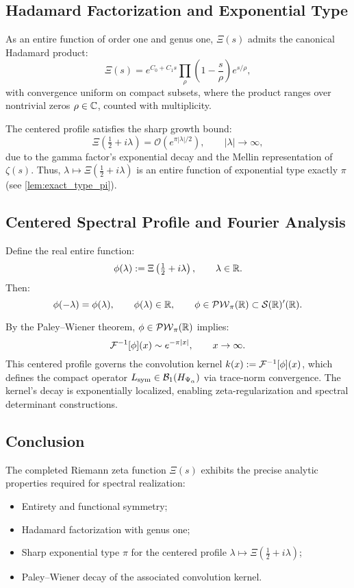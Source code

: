 \subsection*{Hadamard Factorization and Exponential Type}

As an entire function of order one and genus one, \( \Xi(s) \) admits the canonical Hadamard product:
\[
\Xi(s) = e^{C_0 + C_1 s} \prod_{\rho} \left( 1 - \frac{s}{\rho} \right) e^{s/\rho},
\]
with convergence uniform on compact subsets, where the product ranges over nontrivial zeros \( \rho \in \mathbb{C} \), counted with multiplicity.

The centered profile satisfies the sharp growth bound:
\[
\Xi\left( \tfrac{1}{2} + i\lambda \right) = \mathcal{O}\left( e^{\pi |\lambda| / 2} \right), \qquad |\lambda| \to \infty,
\]
due to the gamma factor’s exponential decay and the Mellin representation of \( \zeta(s) \). Thus, \( \lambda \mapsto \Xi(\tfrac{1}{2} + i\lambda) \) is an entire function of exponential type exactly \( \pi \) (see \cref{lem:exact_type_pi}).

\subsection*{Centered Spectral Profile and Fourier Analysis}

Define the real entire function:
\[
\phi(\lambda) := \Xi\left( \tfrac{1}{2} + i\lambda \right), \qquad \lambda \in \mathbb{R}.
\]
Then:
\[
\phi(-\lambda) = \phi(\lambda), \qquad \phi(\lambda) \in \mathbb{R}, \qquad \phi \in \mathcal{PW}_{\pi}(\mathbb{R}) \subset \mathcal{S}(\mathbb{R})'(\mathbb{R}).
\]

By the Paley–Wiener theorem, \( \phi \in \mathcal{PW}_{\pi}(\mathbb{R}) \) implies:
\[
\mathcal{F}^{-1}[\phi](x) \sim e^{-\pi |x|}, \qquad x \to \infty.
\]
This centered profile governs the convolution kernel \( k(x) := \mathcal{F}^{-1}[\phi](x) \), which defines the compact operator \( L_{\mathrm{sym}} \in \mathcal{B}_1(H_{\Psi_\alpha}) \) via trace-norm convergence. The kernel's decay is exponentially localized, enabling zeta-regularization and spectral determinant constructions.

\subsection*{Conclusion}

The completed Riemann zeta function \( \Xi(s) \) exhibits the precise analytic properties required for spectral realization:
\begin{itemize}
  \item Entirety and functional symmetry;
  \item Hadamard factorization with genus one;
  \item Sharp exponential type \( \pi \) for the centered profile \( \lambda \mapsto \Xi(\tfrac{1}{2} + i\lambda) \);
  \item Paley–Wiener decay of the associated convolution kernel.
\end{itemize}

